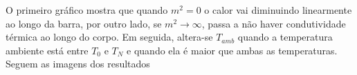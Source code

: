 \documentclass[a4paper, 12pt]{article}
\begin{document}
\begin{figure}[ht!]
\centering
  \qquad
\end{figure}
O primeiro gráfico mostra que quando $m^2=0$ o calor vai diminuindo linearmente ao longo da barra, por outro lado, se $m^2 \to \infty$, passa a não haver condutividade térmica ao longo do corpo.
\newline
Em seguida, altera-se $T_{amb}$ quando a temperatura ambiente está entre $T_0$ e $T_{N}$ e quando ela é maior que ambas as temperaturas. Seguem as imagens dos resultados
\begin{figure}[ht!]
\centering
  \qquad
\end{figure}
\end{document}
